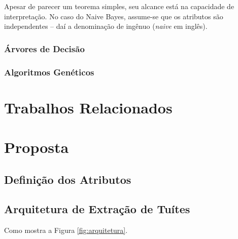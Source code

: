 \documentclass[oneside,openright,12pt]{ufsm_2015} %
\begin{document}
\par Apesar de parecer um teorema simples, seu alcance está na capacidade de interpretação. No caso do Naive Bayes, assume-se que os atributos são independentes -- daí a denominação de ingênuo (\textit{naive} em inglês).

\subsection{Árvores de Decisão}
\label{sec:arvores-decisao}

\subsection{Algoritmos Genéticos}
\label{sec:alg-geneticos}


\chapter{Trabalhos Relacionados}
\label{sec:trab-relacionados}


\chapter{Proposta}
\label{sec:proposta}

\section{Definição dos Atributos}
\label{sec:def-atributos}

\section{Arquitetura de Extração de Tuítes}
\label{sec:arq-extracao}

\par Como mostra a Figura \ref{fig:arquitetura}.
\end{document}
